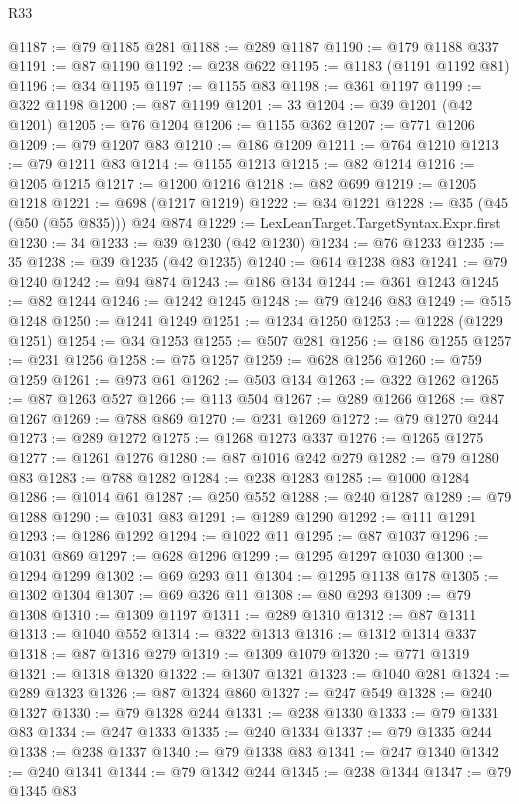 \begin{lexlean}{R33}
\begin{coremodule}
@1187 := @79 @1185 @281
@1188 := @289 @1187
@1190 := @179 @1188 @337
@1191 := @87 @1190
@1192 := @238 @622
@1195 := @1183 (@1191 @1192 @81)
@1196 := @34 @1195
@1197 := @1155 @83
@1198 := @361 @1197
@1199 := @322 @1198
@1200 := @87 @1199
@1201 := 33
@1204 := @39 @1201 (@42 @1201)
@1205 := @76 @1204
@1206 := @1155 @362
@1207 := @771 @1206
@1209 := @79 @1207 @83
@1210 := @186 @1209
@1211 := @764 @1210
@1213 := @79 @1211 @83
@1214 := @1155 @1213
@1215 := @82 @1214
@1216 := @1205 @1215
@1217 := @1200 @1216
@1218 := @82 @699
@1219 := @1205 @1218
@1221 := @698 (@1217 @1219)
@1222 := @34 @1221
@1228 := @35 (@45 (@50 (@55 @835))) @24 @874
@1229 := LexLeanTarget.TargetSyntax.Expr.first
@1230 := 34
@1233 := @39 @1230 (@42 @1230)
@1234 := @76 @1233
@1235 := 35
@1238 := @39 @1235 (@42 @1235)
@1240 := @614 @1238 @83
@1241 := @79 @1240
@1242 := @94 @874
@1243 := @186 @134
@1244 := @361 @1243
@1245 := @82 @1244
@1246 := @1242 @1245
@1248 := @79 @1246 @83
@1249 := @515 @1248
@1250 := @1241 @1249
@1251 := @1234 @1250
@1253 := @1228 (@1229 @1251)
@1254 := @34 @1253
@1255 := @507 @281
@1256 := @186 @1255
@1257 := @231 @1256
@1258 := @75 @1257
@1259 := @628 @1256
@1260 := @759 @1259
@1261 := @973 @61
@1262 := @503 @134
@1263 := @322 @1262
@1265 := @87 @1263 @527
@1266 := @113 @504
@1267 := @289 @1266
@1268 := @87 @1267
@1269 := @788 @869
@1270 := @231 @1269
@1272 := @79 @1270 @244
@1273 := @289 @1272
@1275 := @1268 @1273 @337
@1276 := @1265 @1275
@1277 := @1261 @1276
@1280 := @87 @1016 @242 @279
@1282 := @79 @1280 @83
@1283 := @788 @1282
@1284 := @238 @1283
@1285 := @1000 @1284
@1286 := @1014 @61
@1287 := @250 @552
@1288 := @240 @1287
@1289 := @79 @1288
@1290 := @1031 @83
@1291 := @1289 @1290
@1292 := @111 @1291
@1293 := @1286 @1292
@1294 := @1022 @11
@1295 := @87 @1037
@1296 := @1031 @869
@1297 := @628 @1296
@1299 := @1295 @1297 @1030
@1300 := @1294 @1299
@1302 := @69 @293 @11
@1304 := @1295 @1138 @178
@1305 := @1302 @1304
@1307 := @69 @326 @11
@1308 := @80 @293
@1309 := @79 @1308
@1310 := @1309 @1197
@1311 := @289 @1310
@1312 := @87 @1311
@1313 := @1040 @552
@1314 := @322 @1313
@1316 := @1312 @1314 @337
@1318 := @87 @1316 @279
@1319 := @1309 @1079
@1320 := @771 @1319
@1321 := @1318 @1320
@1322 := @1307 @1321
@1323 := @1040 @281
@1324 := @289 @1323
@1326 := @87 @1324 @860
@1327 := @247 @549
@1328 := @240 @1327
@1330 := @79 @1328 @244
@1331 := @238 @1330
@1333 := @79 @1331 @83
@1334 := @247 @1333
@1335 := @240 @1334
@1337 := @79 @1335 @244
@1338 := @238 @1337
@1340 := @79 @1338 @83
@1341 := @247 @1340
@1342 := @240 @1341
@1344 := @79 @1342 @244
@1345 := @238 @1344
@1347 := @79 @1345 @83

\end{coremodule}
\end{lexlean}

